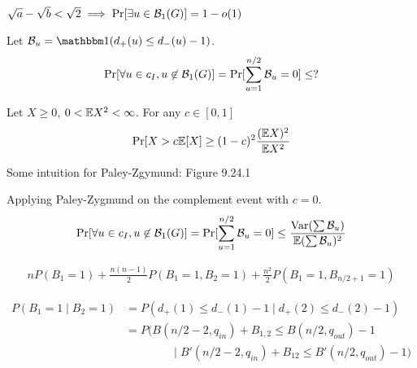 \begin{lemma}
  $\sqrt{a} - \sqrt{b} < \sqrt{2} \implies \Pr[\exists u \in \mathcal{B}_1(G)] = 1 - o(1)$
\end{lemma}

Let $\cB_u = \ind(d_+(u) \leq d_-(u) - 1)$.
\begin{align}
  \Pr[\forall u \in c_I, u \not\in \mathcal{B}_1(G)]
  = \Pr[ \sum_{u=1}^{n/2} \mathcal{B}_u = 0 ]
  \leq ?
\end{align}

\begin{theorem}
  Let $X \geq 0$, $0 < \mathbb{E} X^2 < \infty$.
  For any $c \in [0,1]$
  \begin{align}
    \Pr[X > c \mathbb{E}[X] \geq (1 - c)^2 \frac{(\mathbb{E} X)^2}{\mathbb{E} X^2}
  \end{align}
\end{theorem}

Some intuition for Paley-Zgymund: Figure 9.24.1

Applying Paley-Zygmund on the complement event with $c=0$.
\begin{align}
  \Pr[\forall u \in c_I, u \not\in \mathcal{B}_1(G)]
  = \Pr[ \sum_{u=1}^{n/2} \mathcal{B}_u = 0 ]
  \leq \frac{\operatorname{Var}(\sum \mathcal{B}_u)}{\mathbb{E} (\sum \mathcal{B}_u)^2}
\end{align}

\begin{align}
  n P(B_1 = 1) + \frac{n (n-1)}{2} P(B_1 = 1, B_2 = 1)
  + \frac{n^2}{2} P(B_1 = 1, B_{n/2 + 1} = 1)
\end{align}

\begin{align}
  P(B_1 = 1 \mid B_2 = 1)
  &= P(d_+(1) \leq d_-(1) - 1 \mid d_+(2) \leq d_-(2) - 1) \\
  &= P( B(n/2-2, q_{in}) + B_{1,2} \leq B(n/2, q_{out}) - 1 \\
  &\qquad\qquad \mid B'(n/2 - 2, q_{in}) + B_{12} \leq B'(n/2, q_{out}) - 1 )
\end{align}
